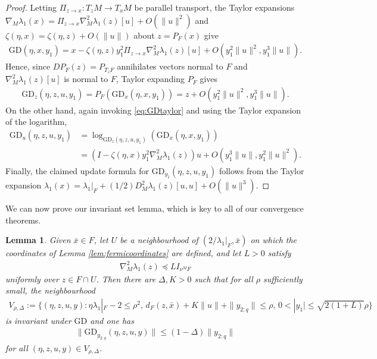 \documentclass{article}
\newcommand{\GD}{\mathrm{GD}}
\theoremstyle{plain}
\newtheorem{lemma}[theorem]{Lemma}
\theoremstyle{definition}
\theoremstyle{remark}
\begin{document}
\begin{proof}
Letting $\Pi_{z\rightarrow x}:T_zM\rightarrow T_xM$ be parallel transport, the Taylor expansions $\nabla_M\lambda_1(x) = \Pi_{z\rightarrow x}\nabla^2_M\lambda_1(z)[u] + O(\|u\|^2)$ and $\zeta(\eta,x) = \zeta(\eta,z) + O(\|u\|)$ about $z = P_F(x)$ give
\begin{align}\label{eq:GDtaylor}
\GD(\eta,x,y_1) = x-\zeta(\eta,z)y_1^2\Pi_{z\rightarrow x}\nabla^2_M\lambda_1(z)[u] + O(y_1^2\|u\|^2,y_1^3\|u\|).
\end{align}
Hence, since $DP_F(z) = P_{T_zF}$ annihilates vectors normal to $F$ and $\nabla^2_M\lambda_1(z)[u]$ is normal to $F$, Taylor expanding $P_F$ gives
\begin{align}
    \GD_z(\eta,z,u,y_1) = P_F(\GD_x(\eta,x,y_1)) = z + O(y_1^2\|u\|^2,y_1^3\|u\|).
\end{align}
On the other hand, again invoking \eqref{eq:GDtaylor} and using the Taylor expansion of the logarithm,
\begin{align}
    \GD_u(\eta,z,u,y_1) &= \log_{\GD_z(\eta,z,u,y_1)}(\GD_x(\eta,x,y_1))\\&= (I-\zeta(\eta,x)y_1^2\nabla^2_M\lambda_1(z))u + O(y_1^3\|u\|,y_1^2\|u\|^2).
\end{align}
Finally, the claimed update formula for $\GD_{y_1}(\eta,z,u,y_1)$ follows from the Taylor expansion $\lambda_1(x) = \lambda_1|_F + (1/2)D^2_M\lambda_1(z)[u,u] + O(\|u\|^3)$.
\end{proof}

We can now prove our invariant set lemma, which is key to all of our convergence theorems.

\begin{lemma}\label{lem:reduction1}
    Given $\bar{x}\in F$, let $U$ be a neighbourhood of $(2/\lambda_1|_F,\bar{x})$ on which the coordinates of Lemma \ref{lem:fermicoordinates} are defined, and let $L>0$ satisfy
    \begin{align}
    \nabla^2_M\lambda_1(z)\preceq L I_{\nu^MF}
    \end{align}
    uniformly over $z\in F\cap U$. Then there are $\Delta,K>0$ such that for all $\rho$ sufficiently small, the neighbourhood
    \begin{align}\label{eq:Vrho}
    V_{\rho,\Delta}:=\{(\eta,z,u,y):\eta\lambda_1|_F-2\leq \rho^2,\, d_F(z,\bar{x}) + K\|u\| + \|y_{2:q}\|\leq\rho,\, 0<|y_1|\leq \sqrt{2(1+L)}\rho\}
    \end{align}
    is invariant under $\GD$ and one has
    \begin{align}\label{eq:2:qbound}
        \|\GD_{y_{2:q}}(\eta,z,u,y)\|\leq (1-\Delta)\|y_{2:q}\|
    \end{align}
    for all $(\eta,z,u,y)\in V_{\rho,\Delta}$.
\end{lemma}
\end{document}
